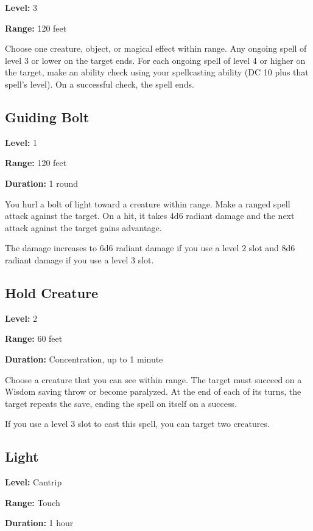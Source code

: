 \documentclass[12pt,letterpaper,twocolumn,openany,nodeprecatedcode,bg=none]{dndbook}
\let\oldsubsection\subsection
\renewcommand{\subsection}[1]{%
  \needspace{5\baselineskip}%
  \oldsubsection{#1}%
}
\begin{document}
\textbf{Level:} 3

\textbf{Range:} 120 feet

Choose one creature, object, or magical effect within range. Any ongoing
spell of level 3 or lower on the target ends. For each ongoing spell of
level 4 or higher on the target, make an ability check using your
spellcasting ability (DC 10 plus that spell's level). On a successful
check, the spell ends.

\newpage

\subsection{Guiding Bolt}\label{guiding-bolt}

\textbf{Level:} 1

\textbf{Range:} 120 feet

\textbf{Duration:} 1 round

You hurl a bolt of light toward a creature within range. Make a ranged
spell attack against the target. On a hit, it takes 4d6 radiant damage
and the next attack against the target gains advantage.

The damage increases to 6d6 radiant damage if you use a level 2 slot and
8d6 radiant damage if you use a level 3 slot.

\subsection{Hold Creature}\label{hold-creature}

\textbf{Level:} 2

\textbf{Range:} 60 feet

\textbf{Duration:} Concentration, up to 1 minute

Choose a creature that you can see within range. The target must succeed
on a Wisdom saving throw or become paralyzed. At the end of each of its
turns, the target repeats the save, ending the spell on itself on a
success.

If you use a level 3 slot to cast this spell, you can target two
creatures.

\subsection{Light}\label{light}

\textbf{Level:} Cantrip

\textbf{Range:} Touch

\textbf{Duration:} 1 hour
\end{document}
